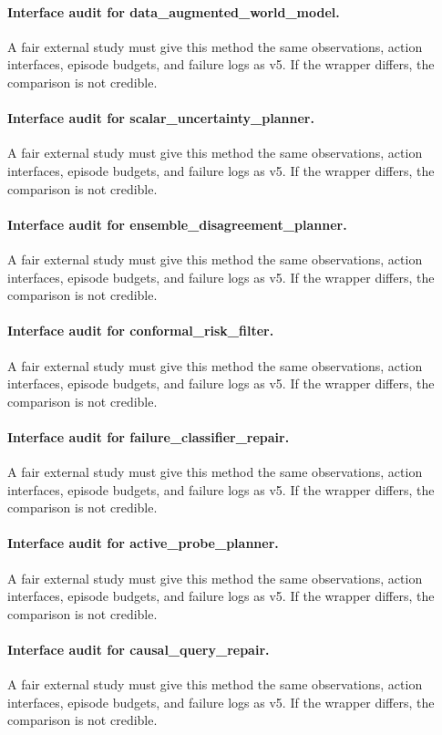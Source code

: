 \documentclass{article}
\begin{document}
\paragraph{Interface audit for data\_augmented\_world\_model.} A fair external study must give this method the same observations, action interfaces, episode budgets, and failure logs as v5. If the wrapper differs, the comparison is not credible.
\paragraph{Interface audit for scalar\_uncertainty\_planner.} A fair external study must give this method the same observations, action interfaces, episode budgets, and failure logs as v5. If the wrapper differs, the comparison is not credible.
\paragraph{Interface audit for ensemble\_disagreement\_planner.} A fair external study must give this method the same observations, action interfaces, episode budgets, and failure logs as v5. If the wrapper differs, the comparison is not credible.
\paragraph{Interface audit for conformal\_risk\_filter.} A fair external study must give this method the same observations, action interfaces, episode budgets, and failure logs as v5. If the wrapper differs, the comparison is not credible.
\paragraph{Interface audit for failure\_classifier\_repair.} A fair external study must give this method the same observations, action interfaces, episode budgets, and failure logs as v5. If the wrapper differs, the comparison is not credible.
\paragraph{Interface audit for active\_probe\_planner.} A fair external study must give this method the same observations, action interfaces, episode budgets, and failure logs as v5. If the wrapper differs, the comparison is not credible.
\paragraph{Interface audit for causal\_query\_repair.} A fair external study must give this method the same observations, action interfaces, episode budgets, and failure logs as v5. If the wrapper differs, the comparison is not credible.
\end{document}
